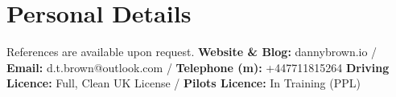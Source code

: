 \documentclass[10pt,letterpaper]{article}
\begin{document}
	\section*{Personal Details}
 	\noindent References are available upon request. \newline \newline
	\textbf{Website \& Blog:} dannybrown.io / \textbf{Email:} d.t.brown@outlook.com / \textbf{Telephone (m):} +447711815264 \newline \textbf{Driving Licence:} Full, Clean UK License / \textbf{Pilots Licence:} In Training (PPL)
\end{document}
